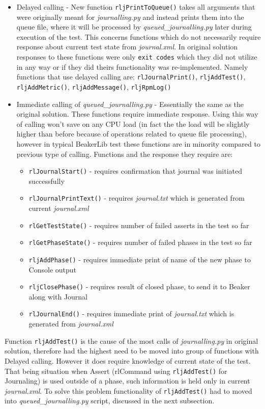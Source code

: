 \begin{itemize}
\item Delayed calling - New function \texttt{rljPrintToQueue()} takes all arguments that were originally meant for \textit{journalling.py} and instead prints them into the queue file, where it will be processed by \textit{queued\_journalling.py} later during execution of the test. This concerns functions which do not necessarily require response about current test state from \textit{journal.xml}.  In original solution responses to these functions were only \texttt{exit codes} which they did not utilize in any way or if they did theirs functionality was re-implemented. Namely functions that use delayed calling are: \texttt{rlJournalPrint()}, \texttt{rljAddTest()}, \texttt{rljAddMetric()}, \texttt{rljAddMessage()}, \texttt{rljRpmLog()}
\item Immediate calling of \textit{queued\_journalling.py} - Essentially the same as the original solution. These functions require immediate response. Using this way of calling won't save on any CPU load (in fact the the load will be slightly higher than before because of operations related to queue file processing), however in typical BeakerLib test these functions are in minority compared to previous type of calling.  Functions and the response they require are:  
\begin{itemize}
\item \texttt{rlJournalStart()} - requires confirmation that journal was initiated successfully
\item \texttt{rlJournalPrintText()} - requires \textit{journal.txt} which is generated from current \mbox{\textit{journal.xml}}
\item \texttt{rlGetTestState()}  - requires number of failed asserts in the test so far
\item \texttt{rlGetPhaseState()} - requires number of failed phases in the test so far
\item \texttt{rljAddPhase()} - requires immediate print of name of the new phase to Console output
\item \texttt{rljClosePhase()} - requires result of closed phase, to send it to Beaker along with Journal
\item \texttt{rlJournalEnd()} - requires immediate print of \textit{journal.txt} which is generated from \textit{journal.xml}
\end{itemize}
\end{itemize}

Function \texttt{rljAddTest()} is the cause of the most calls of \textit{journalling.py} in original solution, therefore had the highest need to be moved into group of functions with Delayed calling. However it does require knowledge of current state of the test. That being situation when Assert (rlCommand using \texttt{rljAddTest()} for Journaling) is used outside of a phase, such information is held only in current \textit{journal.xml}. To solve this problem functionality of  \texttt{rljAddTest()} had to moved into \textit{queued\_journalling.py} script, discussed in the next subsection.


